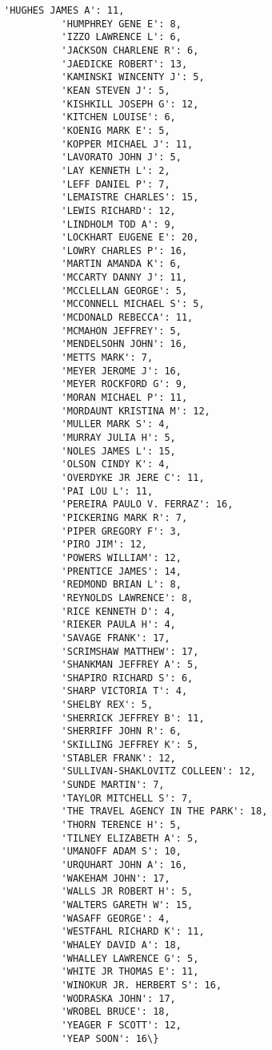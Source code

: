 \documentclass[11pt]{article}
\begin{document}
\begin{Verbatim}[commandchars=\\\{\}]
          'HUGHES JAMES A': 11,
          'HUMPHREY GENE E': 8,
          'IZZO LAWRENCE L': 6,
          'JACKSON CHARLENE R': 6,
          'JAEDICKE ROBERT': 13,
          'KAMINSKI WINCENTY J': 5,
          'KEAN STEVEN J': 5,
          'KISHKILL JOSEPH G': 12,
          'KITCHEN LOUISE': 6,
          'KOENIG MARK E': 5,
          'KOPPER MICHAEL J': 11,
          'LAVORATO JOHN J': 5,
          'LAY KENNETH L': 2,
          'LEFF DANIEL P': 7,
          'LEMAISTRE CHARLES': 15,
          'LEWIS RICHARD': 12,
          'LINDHOLM TOD A': 9,
          'LOCKHART EUGENE E': 20,
          'LOWRY CHARLES P': 16,
          'MARTIN AMANDA K': 6,
          'MCCARTY DANNY J': 11,
          'MCCLELLAN GEORGE': 5,
          'MCCONNELL MICHAEL S': 5,
          'MCDONALD REBECCA': 11,
          'MCMAHON JEFFREY': 5,
          'MENDELSOHN JOHN': 16,
          'METTS MARK': 7,
          'MEYER JEROME J': 16,
          'MEYER ROCKFORD G': 9,
          'MORAN MICHAEL P': 11,
          'MORDAUNT KRISTINA M': 12,
          'MULLER MARK S': 4,
          'MURRAY JULIA H': 5,
          'NOLES JAMES L': 15,
          'OLSON CINDY K': 4,
          'OVERDYKE JR JERE C': 11,
          'PAI LOU L': 11,
          'PEREIRA PAULO V. FERRAZ': 16,
          'PICKERING MARK R': 7,
          'PIPER GREGORY F': 3,
          'PIRO JIM': 12,
          'POWERS WILLIAM': 12,
          'PRENTICE JAMES': 14,
          'REDMOND BRIAN L': 8,
          'REYNOLDS LAWRENCE': 8,
          'RICE KENNETH D': 4,
          'RIEKER PAULA H': 4,
          'SAVAGE FRANK': 17,
          'SCRIMSHAW MATTHEW': 17,
          'SHANKMAN JEFFREY A': 5,
          'SHAPIRO RICHARD S': 6,
          'SHARP VICTORIA T': 4,
          'SHELBY REX': 5,
          'SHERRICK JEFFREY B': 11,
          'SHERRIFF JOHN R': 6,
          'SKILLING JEFFREY K': 5,
          'STABLER FRANK': 12,
          'SULLIVAN-SHAKLOVITZ COLLEEN': 12,
          'SUNDE MARTIN': 7,
          'TAYLOR MITCHELL S': 7,
          'THE TRAVEL AGENCY IN THE PARK': 18,
          'THORN TERENCE H': 5,
          'TILNEY ELIZABETH A': 5,
          'UMANOFF ADAM S': 10,
          'URQUHART JOHN A': 16,
          'WAKEHAM JOHN': 17,
          'WALLS JR ROBERT H': 5,
          'WALTERS GARETH W': 15,
          'WASAFF GEORGE': 4,
          'WESTFAHL RICHARD K': 11,
          'WHALEY DAVID A': 18,
          'WHALLEY LAWRENCE G': 5,
          'WHITE JR THOMAS E': 11,
          'WINOKUR JR. HERBERT S': 16,
          'WODRASKA JOHN': 17,
          'WROBEL BRUCE': 18,
          'YEAGER F SCOTT': 12,
          'YEAP SOON': 16\}
\end{Verbatim}
            
\end{document}
